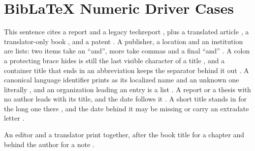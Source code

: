 \documentclass[acmsmall,nonacm,natbib=false]{acmart}
\begin{document}
\thispagestyle{empty}

\section*{BibLaTeX Numeric Driver Cases}
This sentence cites a report \cite{DriverReport} and a legacy techreport
\cite{DriverTechreport}, plus a translated article
\cite{DriverTranslatedArticle}, a translator-only book
\cite{DriverTranslatorBook}, and a patent \cite{DriverPatent}.
A publisher, a location and an institution are lists: two items take an ``and'', more take commas and a final ``and'' \cite{DriverPublishers,DriverInstitutions}.
A colon a protecting brace hides is still the last visible character of a title \cite{DriverProtectedColon,DriverDoubledColon,DriverProtectedMain}, and a container title that ends in an abbreviation keeps the separator behind it out \cite{DriverAbbrevBook,DriverAbbrevPages}.
A canonical language identifier prints as its localized name and an unknown one literally \cite{DriverLanguages}, and an organization leading an entry is a list \cite{DriverOrgLead}.
A report or a thesis with no author leads with its title, and the date follows it \cite{DriverNamelessReport,DriverNamelessThesis}.
A short title stands in for the long one there \cite{DriverShortReport}, and the date behind it may be missing \cite{DriverDatelessReport} or carry an extradate letter \cite{DriverSharedReportA,DriverSharedReportB}.

An editor and a translator print together, after the book title for a chapter and behind the author for a note \cite{DriverInbookTranslated,DriverCollectionTranslated,DriverMiscTranslated}.

\printbibliography
\end{document}
